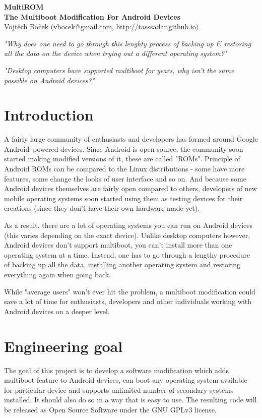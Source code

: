 \documentclass[12pt, a4paper, oneside]{article}
\newcommand{\B}{\textbf} %
\newcommand{\It}{\textit}  %
\begin{document}
\begin{center}
\Large
\B{MultiROM} \\
\large
\B{The Multiboot Modification For Android Devices} \\
\normalsize
Vojtěch Boček (vbocek@gmail.com, \url{http://tasssadar.github.io})
\end{center}

\vspace{5mm}

\It{"Why does one need to go through this lenghty process of backing up & restoring all the data on the device when trying out a different operating system?"}

\It{"Desktop computers have supported multiboot for years, why isn't the same possible on Android devices?"}

\section{Introduction}
A fairly large community of enthusiasts and developers has formed around Google Android\texttrademark~powered devices. Since Android is open-source, the community soon started making modified versions of it, these are called "ROMs"\cite{whatisrom}. Principle of Android ROMs can be compared to the Linux distributions - some have more features, some change the looks of user interface and so on. And because some Android devices themselves are fairly open compared to others, developers of new mobile operating systems soon started using them as testing devices for their creations (since they don't have their own hardware made yet).

As a result, there are a lot of operating systems you can run on Android devices (this varies depending on the exact device). Unlike desktop computers however, Android devices don't support multiboot, you can't install more than one operating system at a time. Instead, one has to go through a lengthy procedure of backing up all the data, installing another operating system and restoring everything again when going back.

While "average users" won't ever hit the problem, a multiboot modification could save a lot of time for enthusiasts, developers and other individuals working with Android devices on a deeper level.

\section{Engineering goal}
The goal of this project is to develop a software modification which adds multiboot feature to Android devices, can boot any operating system available for particular device and supports unlimited number of secondary systems installed. It should also do so in a way that is easy to use. The resulting code will be released as Open Source Software under the GNU GPLv3 license.
\end{document}
